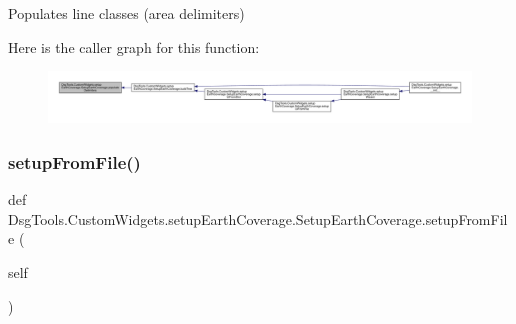 \begin{DoxyVerb}Populates line classes (area delimiters)
\end{DoxyVerb}
 Here is the caller graph for this function\+:
\nopagebreak
\begin{figure}[H]
\begin{center}
\leavevmode
\includegraphics[width=350pt]{class_dsg_tools_1_1_custom_widgets_1_1setup_earth_coverage_1_1_setup_earth_coverage_a72841ab90499e0ff727f324428fab893_icgraph}
\end{center}
\end{figure}
\mbox{\label{class_dsg_tools_1_1_custom_widgets_1_1setup_earth_coverage_1_1_setup_earth_coverage_a54d2b5406367f9ad7310bb422bb1f702}} 
\subsubsection{\texorpdfstring{setup\+From\+File()}{setupFromFile()}}
{\footnotesize\ttfamily def Dsg\+Tools.\+Custom\+Widgets.\+setup\+Earth\+Coverage.\+Setup\+Earth\+Coverage.\+setup\+From\+File (\begin{DoxyParamCaption}\item[{}]{self }\end{DoxyParamCaption})}

